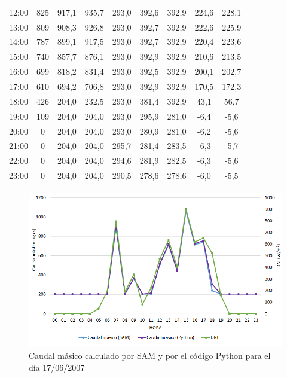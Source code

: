 \begin{table}[H]
{\begin{tabular}{ccccccccc}
12:00 & 825 & 917,1 & 935,7 & 293,0 & 392,6 & 392,9 & 224,6 & 228,1 \\
13:00 & 809 & 908,3 & 926,8 & 293,0 & 392,7 & 392,9 & 222,6 & 225,9 \\
14:00 & 787 & 899,1 & 917,5 & 293,0 & 392,7 & 392,9 & 220,4 & 223,6 \\
15:00 & 740 & 857,7 & 876,1 & 293,0 & 392,9 & 392,9 & 210,6 & 213,5 \\
16:00 & 699 & 818,2 & 831,4 & 293,0 & 392,5 & 392,9 & 200,1 & 202,7 \\
17:00 & 610 & 694,2 & 706,8 & 293,0 & 392,9 & 392,9 & 170,5 & 172,3 \\
18:00 & 426 & 204,0 & 232,5 & 293,0 & 381,4 & 392,9 & 43,1  & 56,7  \\
19:00 & 109 & 204,0 & 204,0 & 293,0 & 295,9 & 281,0 & -6,4  & -5,6  \\
20:00 & 0   & 204,0 & 204,0 & 293,0 & 280,9 & 281,0 & -6,2  & -5,6  \\
21:00 & 0   & 204,0 & 204,0 & 295,7 & 281,4 & 283,5 & -6,3  & -5,7  \\
22:00 & 0   & 204,0 & 204,0 & 294,6 & 281,9 & 282,5 & -6,3  & -5,6  \\
23:00 & 0   & 204,0 & 204,0 & 290,5 & 278,6 & 278,6 & -6,0  & -5,5 
\end{tabular}%
}
\end{table}

\begin{figure}[H]
\includegraphics[width=0.9\linewidth]{images/176caudal.png}
\caption{Caudal másico calculado por SAM y por el código Python para el día 17/06/2007} 
\label{fig:176caudal}
\end{figure}

